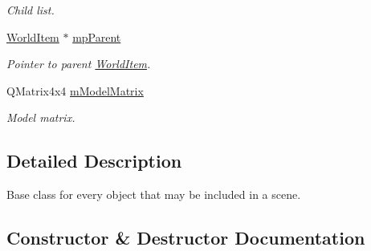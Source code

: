 \begin{DoxyCompactItemize}
\begin{DoxyCompactList}\small\item\em Child list. \end{DoxyCompactList}\item 
\mbox{\label{class_geometry_engine_1_1_geometry_world_item_1_1_world_item_a2b60b69ca2b1a17cef7ff861be2e8077}} 
\mbox{\hyperlink{class_geometry_engine_1_1_geometry_world_item_1_1_world_item}{World\+Item}} $\ast$ \mbox{\hyperlink{class_geometry_engine_1_1_geometry_world_item_1_1_world_item_a2b60b69ca2b1a17cef7ff861be2e8077}{mp\+Parent}}
\begin{DoxyCompactList}\small\item\em Pointer to parent \mbox{\hyperlink{class_geometry_engine_1_1_geometry_world_item_1_1_world_item}{World\+Item}}. \end{DoxyCompactList}\item 
\mbox{\label{class_geometry_engine_1_1_geometry_world_item_1_1_world_item_ae9fa11a7699486578f81a41a27cb59fa}} 
Q\+Matrix4x4 \mbox{\hyperlink{class_geometry_engine_1_1_geometry_world_item_1_1_world_item_ae9fa11a7699486578f81a41a27cb59fa}{m\+Model\+Matrix}}
\begin{DoxyCompactList}\small\item\em Model matrix. \end{DoxyCompactList}\end{DoxyCompactItemize}


\subsection{Detailed Description}
Base class for every object that may be included in a scene. 

\subsection{Constructor \& Destructor Documentation}
\mbox{\label{class_geometry_engine_1_1_geometry_world_item_1_1_world_item_aff1363b5a1dba5557b3d1a07f81829aa}} 
